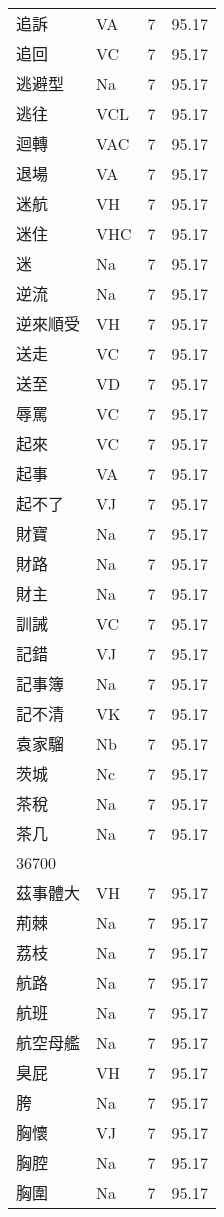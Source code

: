 \documentclass[twocolumn]{book}
\begin{document}
\begin{supertabular}{llrr}
追訴 & VA & 7 &  95.17\\
追回 & VC & 7 &  95.17\\
逃避型 & Na & 7 &  95.17\\
逃往 & VCL & 7 &  95.17\\
迴轉 & VAC & 7 &  95.17\\
退場 & VA & 7 &  95.17\\
迷航 & VH & 7 &  95.17\\
迷住 & VHC & 7 &  95.17\\
迷 & Na & 7 &  95.17\\
逆流 & Na & 7 &  95.17\\
逆來順受 & VH & 7 &  95.17\\
送走 & VC & 7 &  95.17\\
送至 & VD & 7 &  95.17\\
辱罵 & VC & 7 &  95.17\\
起來 & VC & 7 &  95.17\\
起事 & VA & 7 &  95.17\\
起不了 & VJ & 7 &  95.17\\
財寶 & Na & 7 &  95.17\\
財路 & Na & 7 &  95.17\\
財主 & Na & 7 &  95.17\\
訓誡 & VC & 7 &  95.17\\
記錯 & VJ & 7 &  95.17\\
記事簿 & Na & 7 &  95.17\\
記不清 & VK & 7 &  95.17\\
袁家騮 & Nb & 7 &  95.17\\
茨城 & Nc & 7 &  95.17\\
茶稅 & Na & 7 &  95.17\\
茶几 & Na & 7 &  95.17\\
36700\\
茲事體大 & VH & 7 &  95.17\\
荊棘 & Na & 7 &  95.17\\
荔枝 & Na & 7 &  95.17\\
航路 & Na & 7 &  95.17\\
航班 & Na & 7 &  95.17\\
航空母艦 & Na & 7 &  95.17\\
臭屁 & VH & 7 &  95.17\\
胯 & Na & 7 &  95.17\\
胸懷 & VJ & 7 &  95.17\\
胸腔 & Na & 7 &  95.17\\
胸圍 & Na & 7 &  95.17\\

\end{supertabular}
\end{document}
